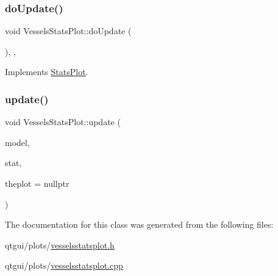\subsubsection{\texorpdfstring{doUpdate()}{doUpdate()}}
{\footnotesize\ttfamily void Vessels\+Stats\+Plot\+::do\+Update (\begin{DoxyParamCaption}{ }\end{DoxyParamCaption})\hspace{0.3cm}{\ttfamily [override]}, {\ttfamily [protected]}, {\ttfamily [virtual]}}



Implements \mbox{\hyperlink{class_stats_plot_a363a428cc00b389a55a03e6d5d7c526e}{Stats\+Plot}}.

\mbox{\label{class_vessels_stats_plot_ade75c576e88d4092031e7bebc55bd5f9}} 
\subsubsection{\texorpdfstring{update()}{update()}}
{\footnotesize\ttfamily void Vessels\+Stats\+Plot\+::update (\begin{DoxyParamCaption}\item[{\mbox{\hyperlink{class_displace_model}{Displace\+Model}} $\ast$}]{model,  }\item[{\mbox{\hyperlink{namespacedisplace_1_1plot_aa453098d286017edd5b0ff3f15ba1013}{displace\+::plot\+::\+Vessels\+Stat}}}]{stat,  }\item[{\mbox{\hyperlink{class_q_custom_plot}{Q\+Custom\+Plot}} $\ast$}]{theplot = {\ttfamily nullptr} }\end{DoxyParamCaption})}



The documentation for this class was generated from the following files\+:\begin{DoxyCompactItemize}
\item 
qtgui/plots/\mbox{\hyperlink{vesselsstatsplot_8h}{vesselsstatsplot.\+h}}\item 
qtgui/plots/\mbox{\hyperlink{vesselsstatsplot_8cpp}{vesselsstatsplot.\+cpp}}\end{DoxyCompactItemize}
